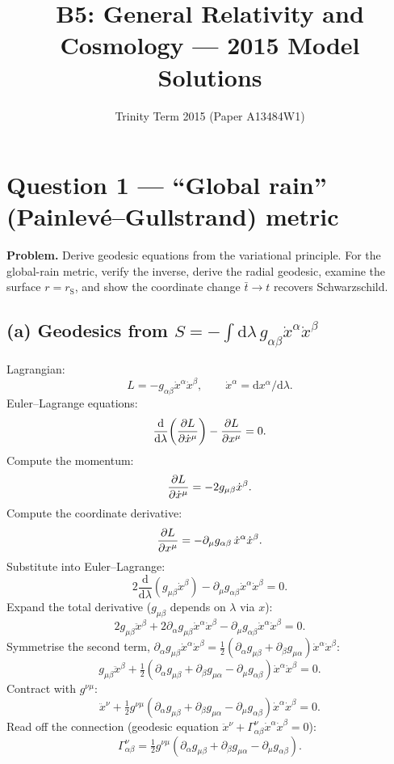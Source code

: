 \documentclass[11pt]{article}
\title{B5: General Relativity and Cosmology --- 2015 Model Solutions}
\author{Trinity Term 2015 (Paper A13484W1)}
\date{}
\newcommand{\de}{\mathrm{d}}
\newcommand{\rs}{r_{\mathrm{S}}}
\begin{document}
\maketitle

\section*{Question 1 --- ``Global rain'' (Painlev\'e--Gullstrand) metric}

\textbf{Problem.} Derive geodesic equations from the variational principle. For the global-rain metric, verify the inverse, derive the radial geodesic, examine the surface $r=\rs$, and show the coordinate change $\bar t\to t$ recovers Schwarzschild.

\subsection*{(a) Geodesics from $S=-\!\int\!\de\lambda\,g_{\alpha\beta}\dot x^\alpha\dot x^\beta$}

Lagrangian:
\[
L = -g_{\alpha\beta}\dot x^\alpha\dot x^\beta,\qquad \dot x^\alpha=\de x^\alpha/\de\lambda.
\]
Euler--Lagrange equations:
\[
\frac{\de}{\de\lambda}\!\left(\pdv{L}{\dot x^\mu}\right) - \pdv{L}{x^\mu} = 0.
\]
Compute the momentum:
\[
\pdv{L}{\dot x^\mu} = -2 g_{\mu\beta}\dot x^\beta.
\]
Compute the coordinate derivative:
\[
\pdv{L}{x^\mu} = -\partial_\mu g_{\alpha\beta}\,\dot x^\alpha\dot x^\beta.
\]
Substitute into Euler--Lagrange:
\[
2\frac{\de}{\de\lambda}(g_{\mu\beta}\dot x^\beta) - \partial_\mu g_{\alpha\beta}\dot x^\alpha\dot x^\beta = 0.
\]
Expand the total derivative ($g_{\mu\beta}$ depends on $\lambda$ via $x$):
\[
2 g_{\mu\beta}\ddot x^\beta + 2\partial_\alpha g_{\mu\beta}\dot x^\alpha\dot x^\beta - \partial_\mu g_{\alpha\beta}\dot x^\alpha\dot x^\beta = 0.
\]
Symmetrise the second term, $\partial_\alpha g_{\mu\beta}\dot x^\alpha\dot x^\beta = \tfrac12(\partial_\alpha g_{\mu\beta}+\partial_\beta g_{\mu\alpha})\dot x^\alpha\dot x^\beta$:
\[
g_{\mu\beta}\ddot x^\beta + \tfrac12(\partial_\alpha g_{\mu\beta}+\partial_\beta g_{\mu\alpha} - \partial_\mu g_{\alpha\beta})\dot x^\alpha\dot x^\beta = 0.
\]
Contract with $g^{\nu\mu}$:
\[
\ddot x^\nu + \tfrac12 g^{\nu\mu}(\partial_\alpha g_{\mu\beta}+\partial_\beta g_{\mu\alpha}-\partial_\mu g_{\alpha\beta})\dot x^\alpha\dot x^\beta = 0.
\]
Read off the connection (geodesic equation $\ddot x^\nu+\Gamma^\nu_{\alpha\beta}\dot x^\alpha\dot x^\beta=0$):
\begin{equation}
\boxed{\;\Gamma^\nu_{\alpha\beta} = \tfrac12 g^{\nu\mu}\!\left(\partial_\alpha g_{\mu\beta}+\partial_\beta g_{\mu\alpha}-\partial_\mu g_{\alpha\beta}\right).\;}
\label{eq:christoffel}
\end{equation}
\end{document}
